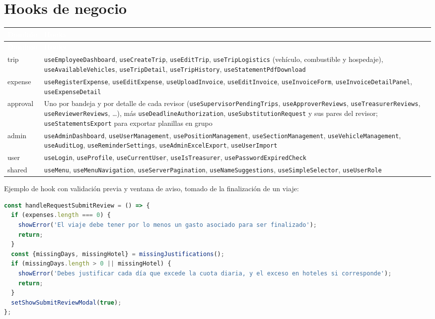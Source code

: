 \documentclass[11pt,letterpaper]{article}
\newcommand{\cabecera}{\rowcolor{maxamPrimario}}
\newcommand{\tth}[1]{\textcolor{white}{\textbf{#1}}}
\newcommand{\code}[1]{\nolinkurl{#1}}
\begin{document}
\section{Hooks de negocio}
\begin{xltabular}{\textwidth}{L{2.4cm} Y}
\cabecera \tth{Dominio} & \tth{Hooks} \\
\endfirsthead
\cabecera \tth{Dominio} & \tth{Hooks} \\
\endhead
{} trip & \code{useEmployeeDashboard}, \code{useCreateTrip}, \code{useEditTrip}, \code{useTripLogistics} (vehículo, combustible y hospedaje), \code{useAvailableVehicles}, \code{useTripDetail}, \code{useTripHistory}, \code{useStatementPdfDownload} \\
expense & \code{useRegisterExpense}, \code{useEditExpense}, \code{useUploadInvoice}, \code{useEditInvoice}, \code{useInvoiceForm}, \code{useInvoiceDetailPanel}, \code{useExpenseDetail} \\
 approval & Uno por bandeja y por detalle de cada revisor (\code{useSupervisorPendingTrips}, \code{useApproverReviews}, \code{useTreasurerReviews}, \code{useReviewerReviews}, \ldots), más \code{useDeadlineAuthorization}, \code{useSubstitutionRequest} y sus pares del revisor; \code{useStatementsExport} para exportar planillas en grupo \\
admin & \code{useAdminDashboard}, \code{useUserManagement}, \code{usePositionManagement}, \code{useSectionManagement}, \code{useVehicleManagement}, \code{useAuditLog}, \code{useReminderSettings}, \code{useAdminExcelExport}, \code{useUserImport} \\
 user & \code{useLogin}, \code{useProfile}, \code{useCurrentUser}, \code{useIsTreasurer}, \code{usePasswordExpiredCheck} \\
shared & \code{useMenu}, \code{useMenuNavigation}, \code{useServerPagination}, \code{useNameSuggestions}, \code{useSimpleSelector}, \code{useUserRole} \\
\end{xltabular}

Ejemplo de hook con validación previa y ventana de aviso, tomado de la finalización de un viaje:

\begin{lstlisting}[language=JavaScript]
const handleRequestSubmitReview = () => {
  if (expenses.length === 0) {
    showError('El viaje debe tener por lo menos un gasto asociado para ser finalizado');
    return;
  }
  const {missingDays, missingHotel} = missingJustifications();
  if (missingDays.length > 0 || missingHotel) {
    showError('Debes justificar cada día que excede la cuota diaria, y el exceso en hoteles si corresponde');
    return;
  }
  setShowSubmitReviewModal(true);
};
\end{lstlisting}
\end{document}
